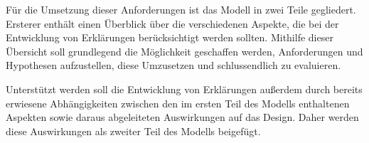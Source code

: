 Für die Umsetzung dieser Anforderungen ist das Modell in zwei Teile gegliedert. Ersterer enthält einen Überblick über die verschiedenen Aspekte, die bei der Entwicklung von Erklärungen berücksichtigt werden sollten. Mithilfe dieser Übersicht soll grundlegend die Möglichkeit geschaffen werden, Anforderungen und Hypothesen aufzustellen, diese Umzusetzen und schlussendlich zu evaluieren.

Unterstützt werden soll die Entwicklung von Erklärungen außerdem durch bereits erwiesene Abhängigkeiten zwischen den im ersten Teil des Modells enthaltenen Aspekten sowie daraus abgeleiteten Auswirkungen auf das Design. Daher werden diese Auswirkungen als zweiter Teil des Modells beigefügt.

